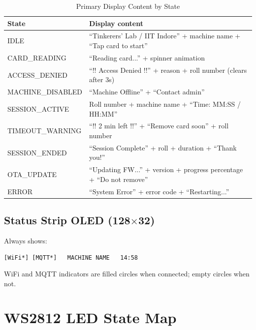 \begin{table}[H]
\centering
\caption{Primary Display Content by State}
\begin{tabular}{L{4cm}L{10.5cm}}
\toprule
\textbf{State} & \textbf{Display content} \\
\midrule
IDLE & ``Tinkerers' Lab / IIT Indore'' + machine name + ``Tap card to start'' \\
CARD\_READING & ``Reading card...'' + spinner animation \\
ACCESS\_DENIED & ``!! Access Denied !!'' + reason + roll number (clears after 3s) \\
MACHINE\_DISABLED & ``Machine Offline'' + ``Contact admin'' \\
SESSION\_ACTIVE & Roll number + machine name + ``Time: MM:SS / HH:MM'' \\
TIMEOUT\_WARNING & ``!! 2 min left !!'' + ``Remove card soon'' + roll number \\
SESSION\_ENDED & ``Session Complete'' + roll + duration + ``Thank you!'' \\
OTA\_UPDATE & ``Updating FW...'' + version + progress percentage + ``Do not remove'' \\
ERROR & ``System Error'' + error code + ``Restarting...'' \\
\bottomrule
\end{tabular}
\end{table}

\subsection{Status Strip OLED (128$\times$32)}

Always shows:
\begin{verbatim}
[WiFi*] [MQTT*]   MACHINE NAME   14:58
\end{verbatim}
WiFi and MQTT indicators are filled circles when connected; empty circles when not.

\section{WS2812 LED State Map}

